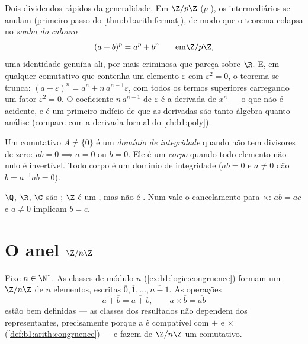 \begin{example}\label{ex:b1:structures:binomialring}
Dois dividendos rápidos da generalidade. Em $\Z/p\Z$ ($p$ ), os
 intermediários se anulam
(primeiro passo do \cref{thm:b1:arith:fermat}), de modo que o teorema
colapsa no \emph{sonho do calouro}
\[
(a + b)^p = a^p + b^p \qquad \text{em} \Z/p\Z ,
\]
uma identidade genuína ali, por mais criminosa que pareça sobre $\R$.
E, em qualquer  comutativo que contenha um elemento $\varepsilon$
com $\varepsilon^2 = 0$, o teorema se trunca:
$(a + \varepsilon)^n = a^n + n\,a^{n-1}\varepsilon$, com todos os termos
superiores carregando um fator $\varepsilon^2 = 0$. O coeficiente
$n\,a^{n-1}$ de $\varepsilon$ é a derivada de $x^n$ ---
o que não é acidente, e é um primeiro indício de que as derivadas são
tanto álgebra quanto análise (compare com a derivada formal do
\cref{ch:b1:poly}).
\end{example}

\begin{definition}\label{def:b1:structures:field}
Um  comutativo $A \neq \{0\}$ é um \emph{domínio de
integridade} quando não tem divisores de
zero: $ab = 0
\implies a = 0$ ou $b = 0$. Ele é um \emph{corpo} quando
todo elemento não nulo é invertível. Todo corpo é um domínio de
integridade ($ab = 0$ e $a \neq 0$ dão $b = a^{-1}ab = 0$).
\end{definition}

\begin{example}
$\Q$, $\R$, $\C$ são ; $\Z$ é um , mas não é
. Num  vale o cancelamento para $\times$: $ab =
ac$ e $a \neq 0$ implicam $b = c$.
\end{example}

\section{O anel $\Z/n\Z$}

\begin{definition}\label{def:b1:structures:zn}
Fixe $n \in \N^*$. As classes de  módulo $n$
(\cref{ex:b1:logic:congruence}) formam um 
$\Z/n\Z$ de $n$ elementos, escritas $\overline 0,
\overline 1, \dots, \overline{n-1}$. As operações
\[
\overline a + \overline b = \overline{a + b},
\qquad
\overline a \times \overline b = \overline{ab}
\]
estão bem definidas --- as classes dos resultados não dependem dos
representantes, precisamente porque a  é compatível com $+$
e $\times$ (\cref{def:b1:arith:congruence}) --- e fazem de $\Z/n\Z$ um
 comutativo.
\end{definition}

